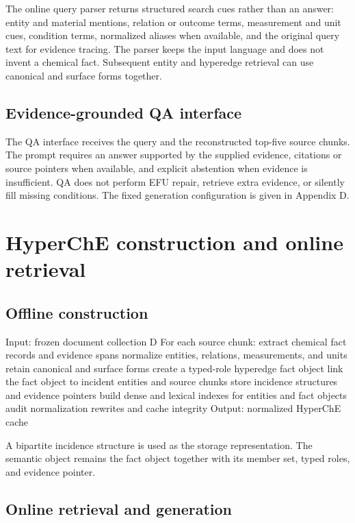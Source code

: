 The online query parser returns structured search cues rather than an answer: entity and material mentions, relation or outcome terms, measurement and unit cues, condition terms, normalized aliases when available, and the original query text for evidence tracing. The parser keeps the input language and does not invent a chemical fact. Subsequent entity and hyperedge retrieval can use canonical and surface forms together.

\subsection{Evidence-grounded QA interface}

The QA interface receives the query and the reconstructed top-five source chunks. The prompt requires an answer supported by the supplied evidence, citations or source pointers when available, and explicit abstention when evidence is insufficient. QA does not perform EFU repair, retrieve extra evidence, or silently fill missing conditions. The fixed generation configuration is given in Appendix D.

\section{HyperChE construction and online retrieval}

\subsection{Offline construction}

Input: frozen document collection D For each source chunk: extract chemical fact records and evidence spans normalize entities, relations, measurements, and units retain canonical and surface forms create a typed-role hyperedge fact object link the fact object to incident entities and source chunks store incidence structures and evidence pointers build dense and lexical indexes for entities and fact objects audit normalization rewrites and cache integrity Output: normalized HyperChE cache

A bipartite incidence structure is used as the storage representation. The semantic object remains the fact object together with its member set, typed roles, and evidence pointer.

\subsection{Online retrieval and generation}

